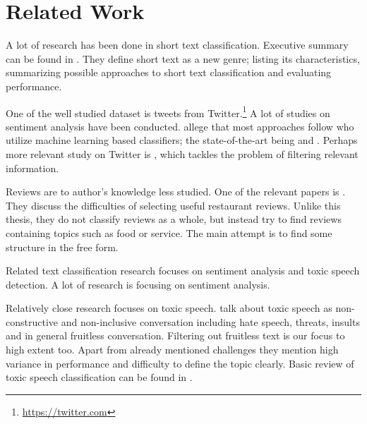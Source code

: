 \section{Related Work}

A lot of research has been done in short text classification.
Executive summary can be found in \citet{Song14}.
They define short text as a new genre; listing its characteristics, summarizing possible approaches to short text classification and evaluating performance.

One of the well studied dataset is tweets from Twitter.\footnote{\url{https://twitter.com}}
A lot of studies on sentiment analysis have been conducted.
\citet{jiang2011target} allege that most approaches follow
\citet{pang2002thumbs} who utilize machine learning based classifiers;
the state-of-the-art being \citet{go2009twitter} and \citet{barbosa2010robust}.
Perhaps more relevant study on Twitter is \citep{sriram2010short},
which tackles the problem of filtering relevant information.

Reviews are to author's knowledge less studied.
One of the relevant papers is \citet{ganu2009beyond}.
They discuss the difficulties of selecting useful restaurant reviews.
Unlike this thesis, they do not classify reviews as a whole, but instead try to find reviews containing topics such as food or service.
The main attempt is to find some structure in the free form.

Related text classification research focuses on sentiment analysis and toxic speech detection.
A lot of research is focusing on sentiment analysis.

Relatively close research focuses on toxic speech.
\citet{van2018challenges} talk about toxic speech as non-constructive and non-inclusive conversation including hate speech, threats, insults and in general fruitless conversation.
Filtering out fruitless text is our focus to high extent too.
Apart from already mentioned challenges they mention high variance in performance and difficulty to define the topic clearly.
Basic review of toxic speech classification can be found in \citet{gunasekara2018review}.
